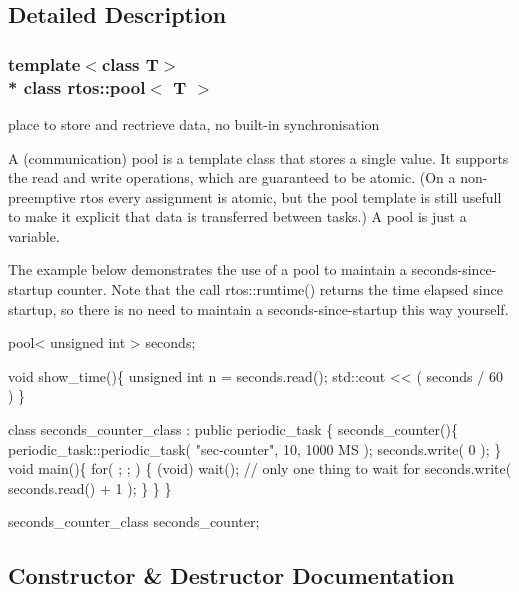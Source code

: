 \subsection{Detailed Description}
\subsubsection*{template$<$class T$>$\\*
class rtos\+::pool$<$ T $>$}

place to store and rectrieve data, no built-\/in synchronisation 

A (communication) pool is a template class that stores a single value. It supports the read and write operations, which are guaranteed to be atomic. (On a non-\/preemptive rtos every assignment is atomic, but the pool template is still usefull to make it explicit that data is transferred between tasks.) A pool is just a variable.

The example below demonstrates the use of a pool to maintain a seconds-\/since-\/startup counter. Note that the call rtos\+::runtime() returns the time elapsed since startup, so there is no need to maintain a seconds-\/since-\/startup this way yourself.


\begin{DoxyCode}
pool< unsigned int > seconds;

\textcolor{keywordtype}{void} show\_time()\{
   \textcolor{keywordtype}{unsigned} \textcolor{keywordtype}{int} n = seconds.read();
   std::cout << ( seconds / 60 ) %
\}

\textcolor{keyword}{class }seconds\_counter\_class : \textcolor{keyword}{public} periodic\_task \{
   seconds\_counter()\{
      periodic\_task::periodic\_task( \textcolor{stringliteral}{"sec-counter"}, 10, 1000 MS );
      seconds.write( 0 );
   \}
   \textcolor{keywordtype}{void} main()\{
      \textcolor{keywordflow}{for}( ; ; ) \{
         (void) wait(); \textcolor{comment}{// only one thing to wait for}
         seconds.write( seconds.read() + 1 );
      \}
   \}
\}

seconds\_counter\_class seconds\_counter;
\end{DoxyCode}
 

\subsection{Constructor \& Destructor Documentation}
